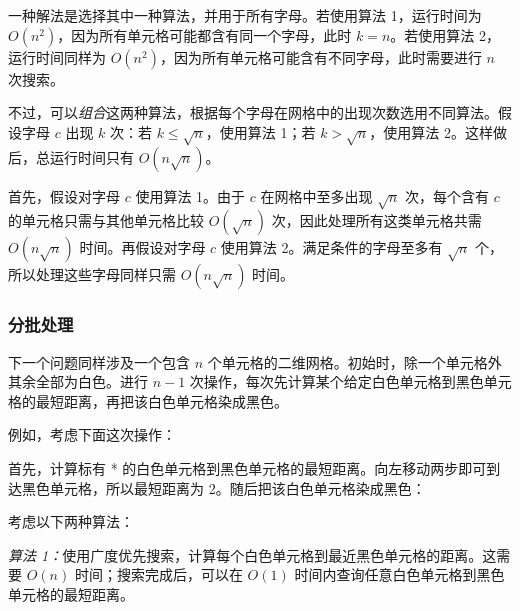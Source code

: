 一种解法是选择其中一种算法，并用于所有字母。若使用算法 1，运行时间为 $O(n^2)$，因为所有单元格可能都含有同一个字母，此时 $k=n$。若使用算法 2，运行时间同样为 $O(n^2)$，因为所有单元格可能含有不同字母，此时需要进行 $n$ 次搜索。

不过，可以\emph{组合}这两种算法，根据每个字母在网格中的出现次数选用不同算法。假设字母 $c$ 出现 $k$ 次：若 $k \le \sqrt n$，使用算法 1；若 $k > \sqrt n$，使用算法 2。这样做后，总运行时间只有 $O(n \sqrt n)$。

首先，假设对字母 $c$ 使用算法 1。由于 $c$ 在网格中至多出现 $\sqrt n$ 次，每个含有 $c$ 的单元格只需与其他单元格比较 $O(\sqrt n)$ 次，因此处理所有这类单元格共需 $O(n \sqrt n)$ 时间。再假设对字母 $c$ 使用算法 2。满足条件的字母至多有 $\sqrt n$ 个，所以处理这些字母同样只需 $O(n \sqrt n)$ 时间。

\subsubsection{分批处理}

下一个问题同样涉及一个包含 $n$ 个单元格的二维网格。初始时，除一个单元格外其余全部为白色。进行 $n-1$ 次操作，每次先计算某个给定白色单元格到黑色单元格的最短距离，再把该白色单元格染成黑色。

例如，考虑下面这次操作：

\begin{center}
\end{center}

首先，计算标有 * 的白色单元格到黑色单元格的最短距离。向左移动两步即可到达黑色单元格，所以最短距离为 2。随后把该白色单元格染成黑色：

\begin{center}
\end{center}

考虑以下两种算法：

\emph{算法 1：}使用广度优先搜索，计算每个白色单元格到最近黑色单元格的距离。这需要 $O(n)$ 时间；搜索完成后，可以在 $O(1)$ 时间内查询任意白色单元格到黑色单元格的最短距离。

